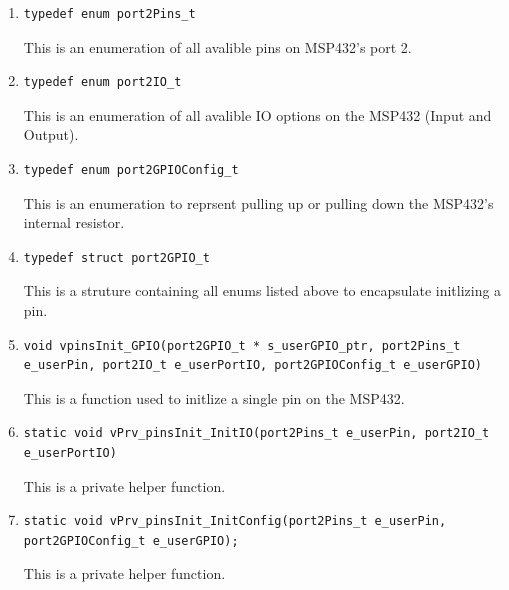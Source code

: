 \documentclass[11pt,a4paper]{article}
\begin{document}
\begin{enumerate}
  \item \begin{lstlisting}[style=functionStyle]
    typedef enum port2Pins_t
  \end{lstlisting}
  This is an enumeration of all avalible pins on MSP432's port 2.

  \item \begin{lstlisting}[style=functionStyle]
    typedef enum port2IO_t
  \end{lstlisting}
  This is an enumeration of all avalible IO options on the MSP432 (Input and Output).

  \item \begin{lstlisting}[style=functionStyle]
    typedef enum port2GPIOConfig_t
  \end{lstlisting}
  This is an enumeration to reprsent pulling up or pulling down the MSP432's internal resistor.

  \item   \begin{lstlisting}[style=functionStyle]
    typedef struct port2GPIO_t
  \end{lstlisting}
  This is a struture containing all enums listed above to encapsulate initlizing a pin.

  \item   \begin{lstlisting}[style=functionStyle]
    void vpinsInit_GPIO(port2GPIO_t * s_userGPIO_ptr, port2Pins_t e_userPin, port2IO_t e_userPortIO, port2GPIOConfig_t e_userGPIO)
  \end{lstlisting}
  This is a function used to initlize a single pin on the MSP432.

  \item   \begin{lstlisting}[style=functionStyle]
    static void vPrv_pinsInit_InitIO(port2Pins_t e_userPin, port2IO_t e_userPortIO)
  \end{lstlisting}
  This is a private helper function.

  \item   \begin{lstlisting}[style=functionStyle]
    static void vPrv_pinsInit_InitConfig(port2Pins_t e_userPin, port2GPIOConfig_t e_userGPIO);
  \end{lstlisting}
  This is a private helper function.
  
\end{enumerate}
\end{document}
